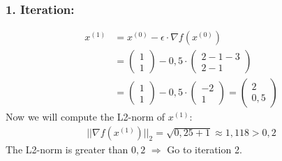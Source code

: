 \documentclass[a4paper]{article}
\begin{document}
        \subsubsection*{1. Iteration:}
            \begin{align*}
                x^{(1)} &= x^{(0)} - \epsilon \cdot \nabla f(x^{(0)})\\
                &= \left( \begin{matrix} 1 \\ 1 \end{matrix} \right) - 0,5 \cdot \left( \begin{matrix} 2-1-3 \\ 2-1 \end{matrix} \right)\\
                &= \left( \begin{matrix} 1 \\ 1 \end{matrix} \right) - 0,5 \cdot \left( \begin{matrix} -2 \\ 1 \end{matrix} \right)
                = \left( \begin{matrix} 2 \\ 0,5 \end{matrix} \right)
            \end{align*}
            Now we will compute the L2-norm of $x^{(1)}$:
            \begin{align*}
                ||\nabla f(x^{(1)})||_2 = \sqrt{0,25 + 1} \approx 1,118 > 0,2
            \end{align*}
            The L2-norm is greater than $0,2$ $\Rightarrow$ Go to iteration 2.
            
\end{document}
